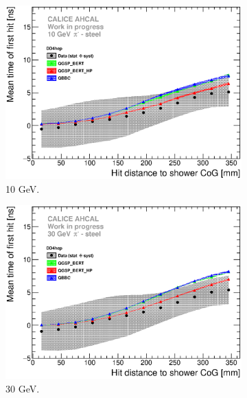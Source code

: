 \begin{figure}[htbp!]
  \begin{subfigure}[t]{0.49\textwidth}
    \centering
    \includegraphics[width=1\textwidth]{../Thesis_Plots/Timing/Pions/Plots/ComparisonToSim/Time_Radius_10GeV_BL_DD4hep.eps}
    \caption{10 GeV.}\label{fig:Radius_BL_SimData_10GeV_DD4hep}
  \end{subfigure}
  \hfill
  \begin{subfigure}[t]{0.49\textwidth}
    \centering
    \includegraphics[width=1\textwidth]{../Thesis_Plots/Timing/Pions/Plots/ComparisonToSim/Time_Radius_30GeV_BL_DD4hep.eps}
    \caption{30 GeV.} \label{fig:Radius_BL_SimData_30GeV_DD4hep}
  \end{subfigure}
  \hfill
  \begin{subfigure}[t]{0.49\textwidth}

\end{subfigure}
\end{figure}
